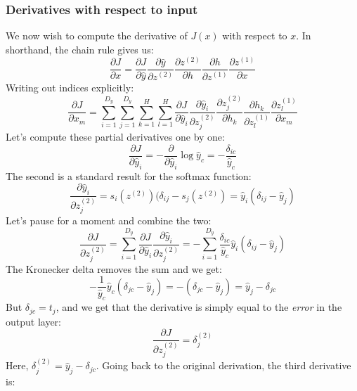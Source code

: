 \documentclass[12pt, a4paper]{article}
\numberwithin{equation}{section}
\begin{document}
\subsubsection{Derivatives with respect to input}
We now wish to compute the derivative of $J(x)$ with respect to $x$. In shorthand, the chain rule gives us:
\begin{equation}
\frac{\partial J}{\partial x}=\frac{\partial J}{\partial\hat{y}}\frac{\partial \hat{y}}{\partial z^{(2)}}\frac{\partial z^{(2)}}{\partial h}\frac{\partial h}{\partial z^{(1)}}\frac{\partial z^{(1)}}{\partial x}
\end{equation}
Writing out indices explicitly:
\begin{equation}
\frac{\partial J}{\partial x_m}=\sum_{i=1}^{D_y}\sum_{j=1}^{D_y}\sum_{k=1}^H\sum_{l=1}^H\frac{\partial J}{\partial\hat{y}_i}\frac{\partial \hat{y}_i}{\partial z^{(2)}_j}\frac{\partial z^{(2)}_j}{\partial h_k}\frac{\partial h_k}{\partial z^{(1)}_l}\frac{\partial z^{(1)}_l}{\partial x_m}
\end{equation}
Let's compute these partial derivatives one by one:
\begin{equation}
\frac{\partial J}{\partial\hat{y}_i}=-\frac{\partial}{\partial\hat{y}_i}\log\hat{y}_c=-\frac{\delta_{ic}}{\hat{y}_c}
\end{equation}
The second is a standard result for the softmax function:
\begin{equation}
\frac{\partial \hat{y}_i}{\partial z^{(2)}_j}=s_i(z^{(2)})(\delta_{ij}-s_j(z^{(2)})=\hat{y}_i(\delta_{ij}-\hat{y}_j)
\end{equation}
Let's pause for a moment and combine the two:
\begin{equation}
\label{output_derivative}
\frac{\partial J}{\partial z^{(2)}_j}=\sum_{i=1}^{D_y}\frac{\partial J}{\partial\hat{y}_i}\frac{\partial \hat{y}_i}{\partial z^{(2)}_j}=-\sum_{i=1}^{D_y}\frac{\delta_{ic}}{\hat{y}_c}\hat{y}_i(\delta_{ij}-\hat{y}_j)
\end{equation}
The Kronecker delta removes the sum and we get:
\begin{equation}
-\frac{1}{\hat{y}_c}\hat{y}_c(\delta_{jc}-\hat{y}_j)=-(\delta_{jc}-\hat{y}_j)=\hat{y}_j-\delta_{jc}
\end{equation}
But $\delta_{jc}=t_j$, and we get that the derivative is simply equal to the \textit{error} in the output layer:
\begin{equation}
\label{ce_softmax}
\frac{\partial J}{\partial z^{(2)}_j}=\delta^{(2)}_j
\end{equation}
Here, $\delta^{(2)}_j=\hat{y}_j-\delta_{jc}$. Going back to the original derivation, the third derivative is:
\end{document}
